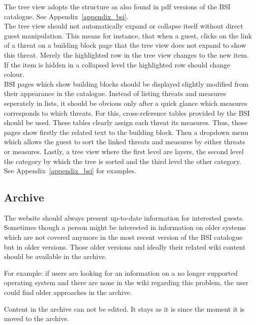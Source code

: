 \begin{tcolorbox}[breakable,colback=red!10,colframe=red!40!black,title=UPDATE 13/11/2017]
The tree view adopts the structure as also found in pdf versions of the BSI catalogue. 
See Appendix~\ref{appendix_bsi}.\\
The tree view should not automatically expand or collapse itself without direct guest manipulation.
This means for instance, that when a guest, clicks on the link of a threat on a building block page that the tree view does not expand to show this threat.
Merely the highlighted row in the tree view changes to the new item.
If the item is hidden in a collapsed level the highlighted row should change colour.
\\
BSI pages which show building blocks should be displayed slightly modified from their appearance in the catalogue.
Instead of listing threats and measures seperately in lists, it should be obvious only after a quick glance which measures corresponds to which threats.
For this, cross-reference tables provided by the BSI should be used.
These tables clearly assign each threat its measures.
Thus, those pages show firstly the related text to the building block.
Then a dropdown menu which allows the guest to sort the linked threats and measures by either threats or measures.
Lastly, a tree view where the first level are layers, the second level the category by which the tree is sorted and the third level the other category.
See Appendix~\ref{appendix_bsi} for examples.
\end{tcolorbox}


\subsection{Archive} 
\label{archive}
The website should always present up-to-date information for interested guests.
Sometimes though a person might be interested in information on older systems which are not covered anymore in the most recent version of the BSI catalogue but in older versions.
Those older versions and ideally their related wiki content should be available in the archive. 

For example: if users are looking for an information on a no longer supported operating system and there are none in the wiki regarding this problem, the user could find older approaches in the archive. 

\begin{tcolorbox}[breakable,colback=red!14,colframe=red!40!black,title=UPDATE 19/11/2017]
Content in the archive can not be edited.
It stays as it is since the moment it is moved to the archive.
\end{tcolorbox}


